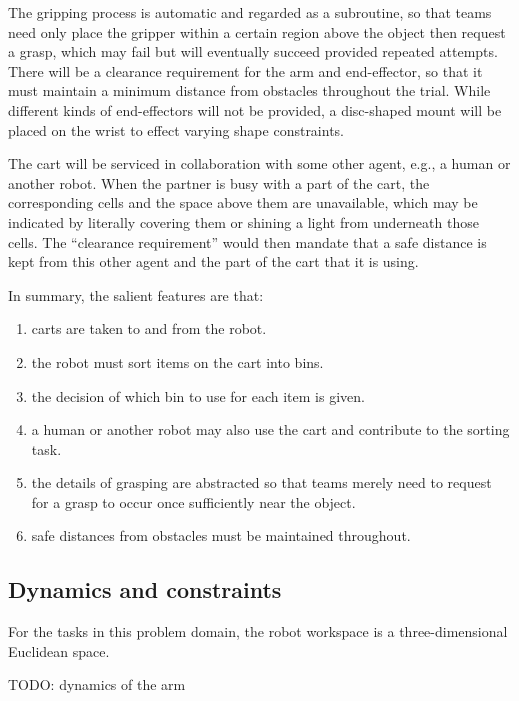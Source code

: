 \documentclass{amsart}
\theoremstyle{definition}
\begin{document}
The gripping process is automatic and regarded as a subroutine, so that teams
need only place the gripper within a certain region above the object then
request a grasp, which may fail but will eventually succeed provided repeated
attempts.  There will be a clearance requirement for the arm and end-effector,
so that it must maintain a minimum distance from obstacles throughout the trial.
While different kinds of end-effectors will not be provided, a disc-shaped mount
will be placed on the wrist to effect varying shape constraints.

The cart will be serviced in collaboration with some other agent, e.g., a human
or another robot.  When the partner is busy with a part of the cart, the
corresponding cells and the space above them are unavailable, which may be
indicated by literally covering them or shining a light from underneath those
cells. The ``clearance requirement'' would then mandate that a safe distance is
kept from this other agent and the part of the cart that it is using.

In summary, the salient features are that:
\begin{enumerate}
\item carts are taken to and from the robot.
\item the robot must sort items on the cart into bins.
\item the decision of which bin to use for each item is given.
\item a human or another robot may also use the cart and contribute to the sorting task.
\item the details of grasping are abstracted so that teams merely need to request for a grasp to occur once sufficiently near the object.
\item safe distances from obstacles must be maintained throughout.
\end{enumerate}

\subsection{Dynamics and constraints}
For the tasks in this problem domain, the robot workspace is a three-dimensional
Euclidean space.

TODO: dynamics of the arm
\end{document}
